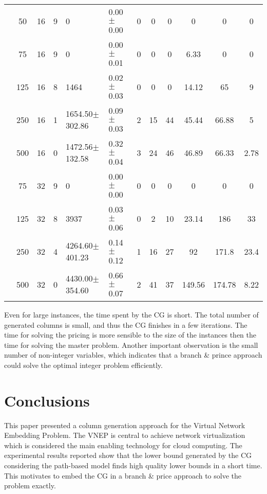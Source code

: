 \documentclass[article]{llncs}
\begin{document}
\begin{table}[h]
\begin{center}
\begin{tabular}{c c c c l l c c c c c c}
 &50      &  16  &    9  &  0                   &        0.00$\pm$0.00  &  0  &          0   &            0   &         0       &       0       &  0       \\
 &75      &  16  &    9  &  0                   &        0.00$\pm$0.01  &  0  &          0   &            0   &         6.33    &       0       &  0       \\
 &125     &  16  &    8  &  1464                &        0.02$\pm$0.03  &  0  &          0   &            0   &         14.12   &       65      &  9       \\
 &250     &  16  &    1  &  1654.50$\pm$302.86  &        0.09$\pm$0.03  &  2  &          15  &            44  &         45.44   &       66.88   &  5       \\
 &500     &  16  &    0  &  1472.56$\pm$132.58  &        0.32$\pm$0.04  &  3  &          24  &            46  &         46.89   &       66.33   &  2.78    \\
 &75      &  32  &    9  &  0                   &        0.00$\pm$0.00  &  0  &          0   &            0   &         0       &       0       &  0       \\
 &125     &  32  &    8  &  3937                &        0.03$\pm$0.06  &  0  &          2   &            10  &         23.14   &       186     &  33      \\
 &250     &  32  &    4  &  4264.60$\pm$401.23  &        0.14$\pm$0.12  &  1  &          16  &            27  &         92      &       171.8   &  23.4    \\
 &500     &  32  &    0  &  4430.00$\pm$354.60  &        0.66$\pm$0.07  &  2  &          41  &            37  &         149.56  &       174.78  &  8.22    \\

\end{tabular}
\end{center}
\end{table}

Even for large instances, the time spent by the CG is short. 
The total number of generated columns is small, and thus the CG finishes in a few iterations.
The time for solving the pricing is more sensible to the size of the instances then the time for solving the master problem.
Another important observation is the small number of non-integer variables, which indicates that a branch \& prince approach
could solve the optimal integer problem efficiently.

\section{Conclusions}
\label{sec:conclusion}
This paper presented a column generation approach for the 
Virtual Network Embedding Problem. 
The VNEP is central to achieve network virtualization which is considered the main enabling technology for cloud computing.
The experimental results reported show that the lower bound generated by the CG considering the path-based model
finds high quality lower bounds in a short time. This motivates to embed the CG in a branch \& price approach to solve the problem exactly.
\end{document}

